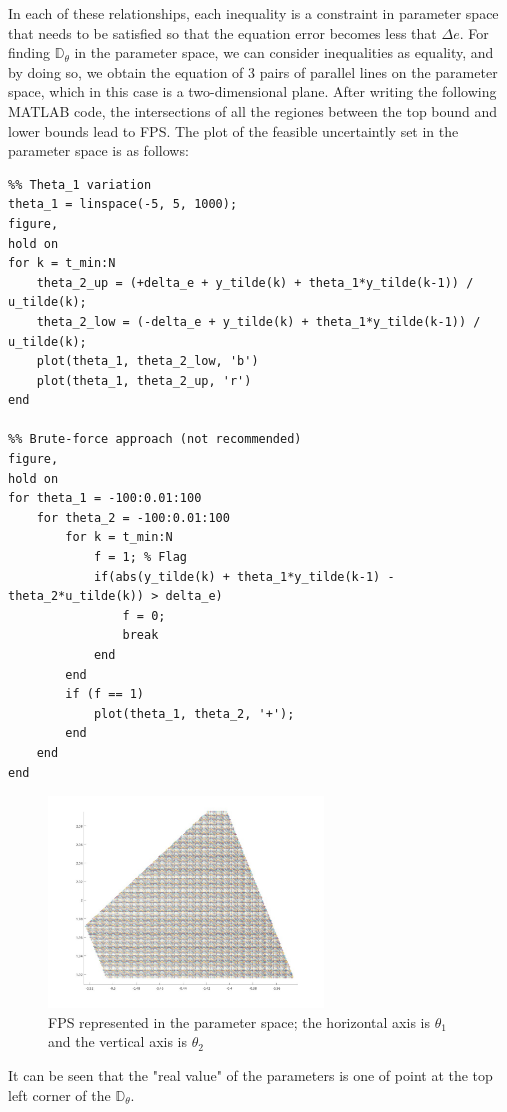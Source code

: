 In each of these relationships, each inequality is a constraint in parameter space that needs to be satisfied so that the equation error becomes less that \(\Delta e\). For finding \(\mathbb{D}_\theta\) in the parameter space, we can consider inequalities as equality, and by doing so, we obtain the equation of 3 pairs of parallel lines on the parameter space, which in this case is a two-dimensional plane. After writing the following MATLAB code, the intersections of all the regiones between the top bound and lower bounds lead to FPS. The plot of the feasible uncertaintly set in the parameter space is as follows:
\begin{example}
\begin{lstlisting}
%% Theta_1 variation
theta_1 = linspace(-5, 5, 1000);
figure,
hold on
for k = t_min:N
    theta_2_up = (+delta_e + y_tilde(k) + theta_1*y_tilde(k-1)) / u_tilde(k);
    theta_2_low = (-delta_e + y_tilde(k) + theta_1*y_tilde(k-1)) / u_tilde(k);
    plot(theta_1, theta_2_low, 'b')
    plot(theta_1, theta_2_up, 'r')
end

%% Brute-force approach (not recommended)
figure,
hold on
for theta_1 = -100:0.01:100
    for theta_2 = -100:0.01:100
        for k = t_min:N
            f = 1; % Flag
            if(abs(y_tilde(k) + theta_1*y_tilde(k-1) - theta_2*u_tilde(k)) > delta_e)
                f = 0;
                break
            end
        end
        if (f == 1)
            plot(theta_1, theta_2, '+');
        end
    end
end
\end{lstlisting}
\end{example}


\begin{figure}[htbp]  %
    \centering
    \includegraphics[width=0.65\textwidth]{images/FPS.jpg}
    \caption{FPS represented in the parameter space; the horizontal axis is \(\theta_1\) and the vertical axis is \(\theta_2 \)}
    \label{fig:PFS}
\end{figure}

It can be seen that the "real value" of the parameters is one of point at the top left corner of the \(\mathbb{D}_\theta\).

